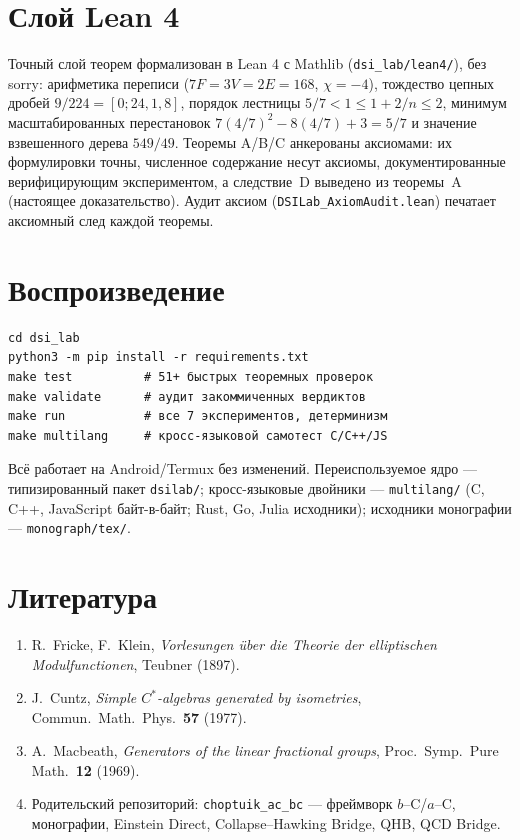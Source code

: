 \documentclass[11pt,a4paper]{article}
\theoremstyle{definition}
\begin{document}
\section{Слой Lean 4}\label{sec:lean}

Точный слой теорем формализован в Lean 4 с Mathlib
(\texttt{dsi\_lab/lean4/}), без sorry: арифметика переписи
($7F = 3V = 2E = 168$, $\chi = -4$), тождество цепных дробей
$9/224 = [0;24,1,8]$, порядок лестницы $5/7 < 1 \le 1 + 2/n \le 2$,
минимум масштабированных перестановок $7(4/7)^2 - 8(4/7) + 3 = 5/7$ и
значение взвешенного дерева $549/49$. Теоремы A/B/C анкерованы
аксиомами: их формулировки точны, численное содержание несут аксиомы,
документированные верифицирующим экспериментом, а следствие~D выведено
из теоремы~A (настоящее доказательство). Аудит аксиом
(\texttt{DSILab\_AxiomAudit.lean}) печатает аксиомный след каждой
теоремы.

\section{Воспроизведение}\label{sec:repro}

\begin{verbatim}
cd dsi_lab
python3 -m pip install -r requirements.txt
make test          # 51+ быстрых теоремных проверок
make validate      # аудит закоммиченных вердиктов
make run           # все 7 экспериментов, детерминизм
make multilang     # кросс-языковой самотест C/C++/JS
\end{verbatim}
Всё работает на Android/Termux без изменений. Переиспользуемое ядро ---
типизированный пакет \texttt{dsilab/}; кросс-языковые двойники ---
\texttt{multilang/} (C, C++, JavaScript байт-в-байт; Rust, Go, Julia
исходники); исходники монографии --- \texttt{monograph/tex/}.

\section*{Литература}
\begin{enumerate}
\item R.~Fricke, F.~Klein, \emph{Vorlesungen \"{u}ber die Theorie der elliptischen Modulfunctionen}, Teubner (1897).
\item J.~Cuntz, \emph{Simple $C^*$-algebras generated by isometries}, Commun.\ Math.\ Phys.\ \textbf{57} (1977).
\item A.~Macbeath, \emph{Generators of the linear fractional groups}, Proc.\ Symp.\ Pure Math.\ \textbf{12} (1969).
\item Родительский репозиторий: \texttt{choptuik\_ac\_bc} --- фреймворк $b$--C/$a$--C, монографии, Einstein Direct, Collapse--Hawking Bridge, QHB, QCD Bridge.
\end{enumerate}
\end{document}
